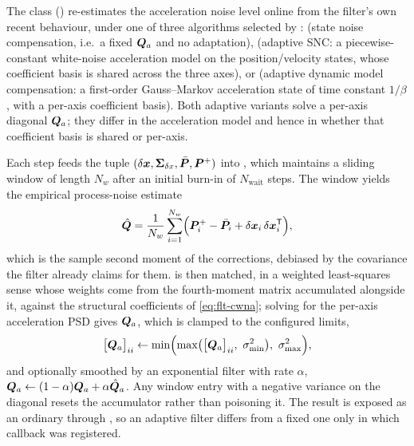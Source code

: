 The class 
() re-estimates the
acceleration noise level online from the filter's own recent behaviour, under
one of three algorithms selected by :
 (state noise compensation, i.e.\ a fixed $\bm{Q}_a$ and no
adaptation),  (adaptive SNC: a piecewise-constant white-noise
acceleration model on the position/velocity states, whose coefficient basis is
shared across the three axes), or  (adaptive dynamic model
compensation: a first-order Gauss--Markov acceleration state of time constant
$1/\beta$, with a per-axis coefficient basis). Both adaptive variants solve a
per-axis diagonal $\bm{Q}_a$; they differ in the acceleration model and hence
in whether that coefficient basis is shared or per-axis.

Each step feeds the tuple $(\delta \bm{x}, \bm{\Sigma}_{\delta x},
\bar{\bm{P}}, \bm{P}^{+})$ into , which maintains a
sliding window of length $N_w$ after an initial burn-in of $N_{\text{wait}}$
steps. The window yields the empirical process-noise estimate
\begin{equation}
  \label{eq:flt-adaptive-qhat}
  \hat{\bm{Q}} = \frac{1}{N_w}\sum_{i=1}^{N_w}
    \Bigl(\bm{P}^{+}_i - \bar{\bm{P}}_i
          + \delta \bm{x}_i\,\delta \bm{x}_i^{\mathsf{T}}\Bigr) ,
\end{equation}
which is the sample second moment of the corrections, debiased by the
covariance the filter already claims for them.  is
then matched, in a weighted least-squares sense whose weights come from the
fourth-moment matrix accumulated alongside it, against the structural
coefficients of \cref{eq:flt-cwna}; solving for the per-axis acceleration PSD
gives $\bm{Q}_a$, which is clamped to the configured limits,
\begin{equation}
  \label{eq:flt-adaptive-clamp}
  \bigl[\mat{Q}_a\bigr]_{ii} \leftarrow
    \min\Bigl(\max\bigl(\bigl[\mat{Q}_a\bigr]_{ii},\ \sigma^2_{\min}\bigr),\
              \sigma^2_{\max}\Bigr) ,
\end{equation}
and optionally smoothed by an exponential filter with rate $\alpha$,
$\bm{Q}_a \leftarrow (1-\alpha)\bm{Q}_a + \alpha \hat{\bm{Q}}_a$. Any window
entry with a negative variance on the diagonal resets the accumulator rather
than poisoning it. The result is exposed as an ordinary
 through
, so an adaptive filter differs
from a fixed one only in which callback was registered.

